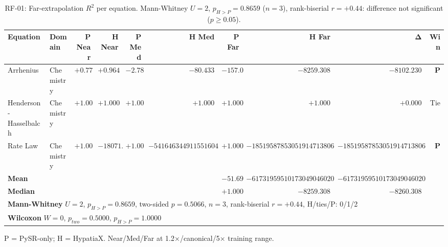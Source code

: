 \begin{table}[htbp]
\centering
\caption{RF-01: Far-extrapolation $R^2$ per equation. Mann-Whitney $U=2$, $p_{H>P}=0.8659$ ($n=3$), rank-biserial $r=+0.44$: difference not significant ($p\geq0.05$).}
\label{tab:rf01_significance}
\small
\begin{tabular}{llrrrrrrrr}
\toprule
\textbf{Equation} & \textbf{Domain} & \textbf{P Near} & \textbf{H Near} & \textbf{P Med} & \textbf{H Med} & \textbf{P Far} & \textbf{H Far} & $\boldsymbol{\Delta}$ & \textbf{Win} \\
\midrule
Arrhenius & Chemistry & $+0.770$ & $+0.964$ & $-2.783$ & $-80.433$ & $-157.078$ & $-8259.308$ & $-8102.230$ & \textbf{P} \\
Henderson-Hasselbalch & Chemistry & $+1.000$ & $+1.000$ & $+1.000$ & $+1.000$ & $+1.000$ & $+1.000$ & $+0.000$ & Tie \\
Rate Law & Chemistry & $+1.000$ & $-18071.498$ & $+1.000$ & $-54164634491155160486204188831776768.000$ & $+1.000$ & $-18519587853051914713806077427591725144592089088.000$ & $-18519587853051914713806077427591725144592089088.000$ & \textbf{P} \\
\midrule
\textbf{Mean} & & & & & & $-51.693$ & $-6173195951017304904602025809197241714864029696.000$ & $-6173195951017304904602025809197241714864029696.000$ & \\
\textbf{Median} & & & & & & $+1.000$ & $-8259.308$ & $-8260.308$ & \\
\midrule
\multicolumn{10}{l}{\textbf{Mann-Whitney} $U=2$, $p_{H>P}=0.8659$, two-sided $p=0.5066$, $n=3$, rank-biserial $r=+0.44$, H/ties/P: 0/1/2} \\
\multicolumn{10}{l}{\textbf{Wilcoxon} $W=0$, $p_{two}=0.5000$, $p_{H>P}=1.0000$} \\
\bottomrule
\end{tabular}
\begin{tablenotes}\small
\item P = PySR-only; H = HypatiaX. Near/Med/Far at 1.2×/canonical/5× training range.
\end{tablenotes}
\end{table}